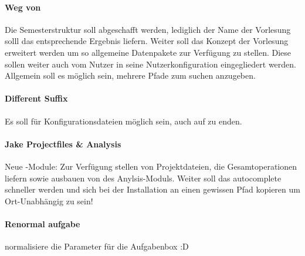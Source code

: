 \paragraph{Weg von }
Die Semesterstruktur soll abgeschafft werden, lediglich der Name der Vorlesung solll das entsprechende Ergebnis liefern. Weiter soll das Konzept der Vorlesung erweitert werden um so allgemeine Datenpakete zur Verfügung zu stellen. Diese sollen weiter auch vom Nutzer in seine Nutzerkonfiguration eingegliedert werden. Allgemein soll es möglich sein, mehrere Pfade zum suchen anzugeben.

\paragraph{Different Suffix}
Es soll für Konfigurationsdateien möglich sein, auch auf  zu enden.

\paragraph{Jake Projectfiles \& Analysis}
Neue \Jake-Module: Zur Verfügung stellen von Projektdateien, die Gesamtoperationen liefern sowie ausbauen von des Anylsis-Moduls. Weiter soll das autocomplete schneller werden und sich \Jake bei der Installation an einen gewissen Pfad kopieren um Ort-Unabhängig zu sein!

\paragraph{Renormal aufgabe}
normalisiere die Parameter für die Aufgabenbox :D